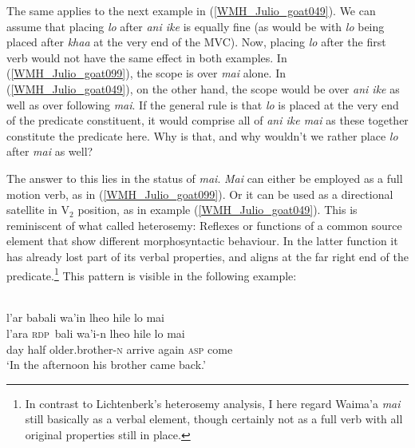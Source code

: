 The same applies to the next example in (\ref{WMH_Julio_goat049}). We can assume that placing \textit{lo} after \textit{ani ike} is equally fine (as would be with \textit{lo} being placed after \textit{khaa} at the very end of the MVC). Now, placing \textit{lo} after the first verb would not have the same effect in both examples. In (\ref{WMH_Julio_goat099}), the scope is over \textit{mai} alone. In (\ref{WMH_Julio_goat049}), on the other hand, the scope would be over \textit{ani ike} as well as over following \textit{mai}. If the general rule is that \textit{lo} is placed at the very end of the predicate constituent, it would comprise all of \textit{ani ike mai} as these together constitute the predicate here. Why is that, and why wouldn't we rather place \textit{lo} after \textit{mai} as well?

The answer to this lies in the status of \textit{mai}. \textit{Mai} can either be employed as a full motion verb, as in (\ref{WMH_Julio_goat099}). Or it can be used as a directional satellite in V$_2$ position, as in example (\ref{WMH_Julio_goat049}). This is reminiscent of what \citet{lichtenberk1991semantic} called heterosemy: Reflexes or functions of a common source element that show different morphosyntactic behaviour. In the latter function it has already lost part of its verbal properties, and aligns at the far right end of the predicate.\footnote{In contrast to Lichtenberk's heterosemy analysis, I here regard Waima'a \textit{mai} still basically as a verbal element, though certainly not as a full verb with all original properties still in place.} This pattern is visible in the following example:
 
\ea
{}\\
\glll l'ar babali wa'in lheo hile lo mai \\
l'ara \textsc{rdp}~bali wa'i-n lheo hile lo mai \\
day half older.brother-\textsc{n} arrive again \textsc{asp} come\\
\glft `In the afternoon his brother came back.'\\
\z

